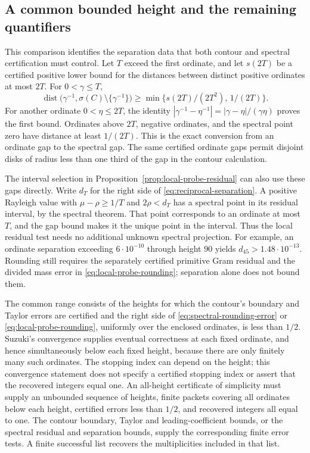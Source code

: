 \subsection{A common bounded height and the remaining quantifiers}
This comparison identifies the separation data that both contour and
spectral certification must control. Let $T$ exceed the first ordinate,
and let $s(2T)$ be a certified positive lower bound for the distances
between distinct positive ordinates at most $2T$. For $0<\gamma\le T$,
\begin{equation}
 \operatorname{dist}\bigl(\gamma^{-1},
               \sigma(C)\setminus\{\gamma^{-1}\}\bigr)
 \ge\min\{s(2T)/(2T^2),\,1/(2T)\}.
 \label{eq:reciprocal-separation}
\end{equation}
For another ordinate $0<\eta\le2T$, the identity
$|\gamma^{-1}-\eta^{-1}|=|\gamma-\eta|/(\gamma\eta)$ proves the
first bound. Ordinates above $2T$, negative ordinates, and the spectral
point zero have distance at least $1/(2T)$.
This is the exact conversion from an ordinate gap to the spectral gap.
The same certified ordinate gaps permit disjoint disks of radius less
than one third of the gap in the contour calculation.

The interval selection in Proposition~\ref{prop:local-probe-residual}
can also use these gaps directly.  Write $d_T$ for the right side of
\eqref{eq:reciprocal-separation}.  A positive Rayleigh value with
$\mu-\rho\ge1/T$ and $2\rho<d_T$ has a spectral point in its
residual interval, by the spectral theorem.  That point corresponds to
an ordinate at most $T$, and the gap bound makes it the unique point
in the interval.  Thus the local residual test needs no additional
unknown spectral projection.  For example, an ordinate separation
exceeding $6\cdot10^{-10}$ through height $90$ yields
$d_{45}>1.48\cdot10^{-13}$.  Rounding still requires the separately
certified primitive Gram residual and the divided mass error in
\eqref{eq:local-probe-rounding}; separation alone does not bound them.

The common range consists of the heights for which the contour's
boundary and Taylor errors are certified and the right side of
\eqref{eq:spectral-rounding-error} or
\eqref{eq:local-probe-rounding}, uniformly over the enclosed
ordinates, is less than $1/2$. Suzuki's convergence supplies eventual
correctness at each fixed ordinate, and hence simultaneously below
each fixed height, because there are only finitely many such ordinates.
The stopping index can depend on the height; this convergence statement
does not specify a certified stopping index or assert that the recovered
integers equal one. An all-height certificate of simplicity must supply
an unbounded sequence of heights, finite packets covering all ordinates
below each height, certified errors less than $1/2$, and recovered
integers all equal to one. The contour boundary, Taylor and
leading-coefficient bounds, or the spectral residual and separation
bounds, supply the corresponding finite error tests. A finite
successful list recovers the multiplicities included in that list.

